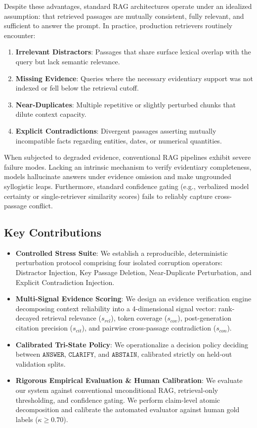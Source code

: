 \documentclass[11pt,a4paper]{article}
\begin{document}
Despite these advantages, standard RAG architectures operate under an idealized assumption: that retrieved passages are mutually consistent, fully relevant, and sufficient to answer the prompt. In practice, production retrievers routinely encounter:
\begin{enumerate}
    \item \textbf{Irrelevant Distractors}: Passages that share surface lexical overlap with the query but lack semantic relevance.
    \item \textbf{Missing Evidence}: Queries where the necessary evidentiary support was not indexed or fell below the retrieval cutoff.
    \item \textbf{Near-Duplicates}: Multiple repetitive or slightly perturbed chunks that dilute context capacity.
    \item \textbf{Explicit Contradictions}: Divergent passages asserting mutually incompatible facts regarding entities, dates, or numerical quantities.
\end{enumerate}

When subjected to degraded evidence, conventional RAG pipelines exhibit severe failure modes. Lacking an intrinsic mechanism to verify evidentiary completeness, models hallucinate answers under evidence omission and make ungrounded syllogistic leaps. Furthermore, standard confidence gating (e.g., verbalized model certainty or single-retriever similarity scores) fails to reliably capture cross-passage conflict.

\subsection{Key Contributions}
\begin{itemize}
    \item \textbf{Controlled Stress Suite}: We establish a reproducible, deterministic perturbation protocol comprising four isolated corruption operators: Distractor Injection, Key Passage Deletion, Near-Duplicate Perturbation, and Explicit Contradiction Injection.
    \item \textbf{Multi-Signal Evidence Scoring}: We design an evidence verification engine decomposing context reliability into a 4-dimensional signal vector: rank-decayed retrieval relevance ($s_{rel}$), token coverage ($s_{cov}$), post-generation citation precision ($s_{cit}$), and pairwise cross-passage contradiction ($s_{con}$).
    \item \textbf{Calibrated Tri-State Policy}: We operationalize a decision policy deciding between $\mathtt{ANSWER}$, $\mathtt{CLARIFY}$, and $\mathtt{ABSTAIN}$, calibrated strictly on held-out validation splits.
    \item \textbf{Rigorous Empirical Evaluation \& Human Calibration}: We evaluate our system against conventional unconditional RAG, retrieval-only thresholding, and confidence gating. We perform claim-level atomic decomposition and calibrate the automated evaluator against human gold labels ($\kappa \ge 0.70$).
\end{itemize}
\end{document}
